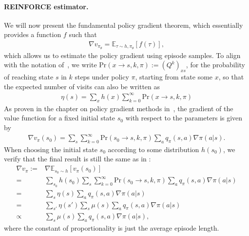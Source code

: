 \documentclass[a4paper]{report}
\theoremstyle{definition}
\theoremstyle{plain}
\begin{document}
\paragraph{REINFORCE estimator.}

We will now present the fundamental policy gradient theorem, which essentially
provides a function $f$ such that
\begin{align*}
  \nabla v_{\pi_{\theta}} = \mathbb{E}_{\tau \sim h,\pi_{\theta}}[f(\tau)] ,
\end{align*}
which allows us to estimate the policy gradient using episode samples.
%
To align with the notation
of~\cite{suttonReinforcementLearningIntroduction2018}, we write
$\mathrm{Pr}(x \rightarrow s, k, \pi) := (Q^{k})_{xs}$, for the probability of
reaching state $s$ in $k$ steps under policy $\pi$, starting from state some
$x$, so that the expected number of visits can also be written as
\begin{align*}
  \eta(s) = \sum_{x} h(x) \sum_{k=0}^{\infty} \mathrm{Pr}(x \rightarrow s, k, \pi)
\end{align*}
%
As proven in the chapter on policy gradient methods
in~\cite{suttonReinforcementLearningIntroduction2018}, the gradient of the value
function for a fixed initial state $s_0$ with respect to the parameters is given
by
\begin{align}
  \nabla v_{\pi}(s_{0}) = \sum_{s} \sum_{k=0}^{\infty} \mathrm{Pr}(s_{0} \rightarrow s, k, \pi) \sum_{a} q_{\pi}(s,a) \nabla \pi(a|s) .
\end{align}
When choosing the initial state $s_{0}$ according to some distribution
$h(s_{0})$, we verify that the final result is still the same as in
\cite{suttonReinforcementLearningIntroduction2018}:
\begin{subequations}
\begin{align}
  \nabla v_{\pi} :=& \nabla \mathbb{E}_{s_{0} \sim h}[v_{\pi}(s_{0})] \\
  =& \sum_{s_{0}} h(s_{0}) \sum_{s} \sum_{k=0}^{\infty} \mathrm{Pr}(s_{0} \rightarrow s, k, \pi) \sum_{a} q_{\pi}(s,a) \nabla \pi(a|s) \\
  =& \sum_{s} \eta(s) \sum_{a} q_{\pi}(s,a) \nabla \pi(a|s) \\
  =& \sum_{s'} \eta(s') \sum_{s} \mu(s) \sum_{a} q_{\pi}(s,a) \nabla \pi(a|s) \\
  \propto& \sum_{s} \mu(s) \sum_{a} q_{\pi}(s,a) \nabla \pi(a|s) ,
\end{align}
\end{subequations}
where the constant of proportionality is just the average episode length.
\end{document}
